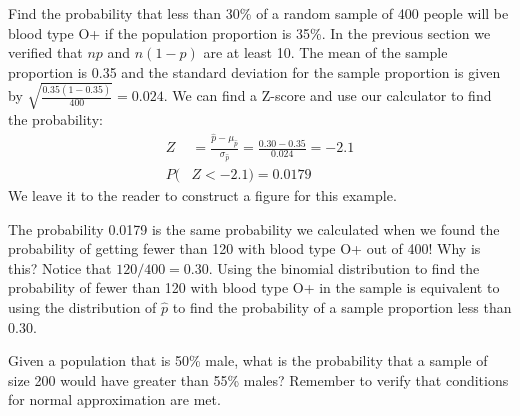 \begin{examplewrap}
\begin{nexample}{Find the probability that less than 30\% of a random sample of 400 people will be blood type O+ if the population proportion is 35\%.}
In the previous section we verified that $np$ and $n(1-p)$ are at least 10. The mean of the sample proportion is 0.35 and the standard deviation for the sample proportion is given by $\sqrt{\frac{0.35(1-0.35)}{400}}=0.024$. We can find a Z-score and use our calculator to find the probability:
\begin{align*}
Z &= \frac{\hat{p} - \mu_{\hat{p}}}{\sigma_{\hat{p}}} = \frac{0.30 - 0.35}{0.024} = -2.1 \\
P(&Z < -2.1) = 0.0179
\end{align*}
We leave it to the reader to construct a figure for this example.
\label{smokers}
\end{nexample}
\end{examplewrap}


\begin{examplewrap}
\begin{nexample}{The probability 0.0179 is the same probability we calculated when we found the probability of getting fewer than 120 with blood type O+ out of 400! Why is this?}
Notice that $120/400=0.30$. Using the binomial distribution to find the probability of fewer than 120 with blood type O+ in the sample is equivalent to using the distribution of $\hat{p}$ to find the probability of a sample proportion less than 0.30.
\end{nexample}
\end{examplewrap}


\begin{exercisewrap}
\begin{nexercise}Given a population that is 50\% male, what is the probability that a sample of size 200 would have greater than 55\% males?  Remember to verify that conditions for normal approximation are met.\footnotemark
\end{nexercise}
\end{exercisewrap}


